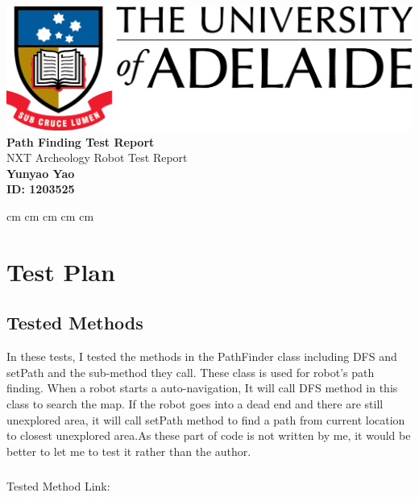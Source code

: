 \documentclass[11pt, a4paper]{report}
\begin{document}
\begin{center}
\includegraphics[scale=1.5]{./image/UniLogo}\\[3cm] 

\textbf{\Huge Path Finding Test Report}\\[3cm]

{\LARGE NXT Archeology Robot Test Report }\\[6cm]

\textbf{\large Yunyao Yao }\\[1cm]

\textbf{\large ID: 1203525}\\
\end{center}

\pagebreak
{} cm
 cm
 cm
 cm
 cm



\chapter{Test Plan}

\section{Tested Methods}
In these tests, I tested the methods in the PathFinder class including DFS and setPath and the sub-method they call. These class is used for robot's path finding. When a robot starts a auto-navigation, It will call DFS method in this class to search the map. If the robot goes into a dead end and there are still unexplored area, it will call setPath method to find a path from current location to closest unexplored area.As these part of code is not written by me, it would be better to let me to test it rather than the author.\\

\paragraph{}Tested Method Link:
\end{document}
